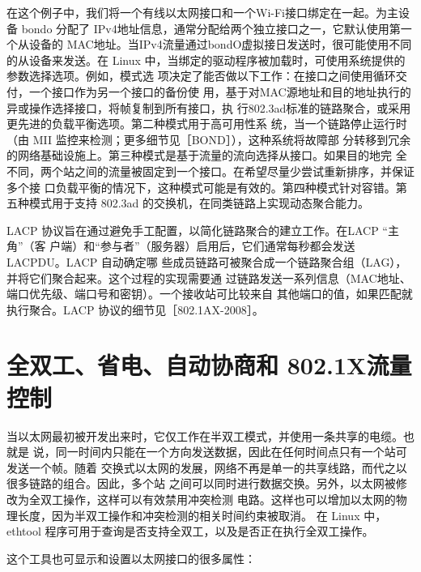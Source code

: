 在这个例子中，我们将一个有线以太网接口和一个Wi-Fi接口绑定在一起。为主设备
bondo 分配了 IPv4地址信息，通常分配给两个独立接口之一，它默认使用第一个从设备的
MAC地址。当IPv4流量通过bondO虚拟接日发送时，很可能使用不同的从设备来发送。在
Linux 中，当绑定的驱动程序被加载时，可使用系统提供的参数选择选项。例如，模式选
项决定了能否做以下工作：在接口之间使用循环交付，一个接口作为另一个接口的备份使
用，基于对MAC源地址和目的地址执行的异或操作选择接口，将帧复制到所有接口，执
行802.3ad标准的链路聚合，或采用更先进的负载平衡选项。第二种模式用于高可用性系
统，当一个链路停止运行时（由 MII 监控来检测；更多细节见［BOND］），这种系统将故障部
分转移到冗余的网络基础设施上。第三种模式是基于流量的流向选择从接口。如果目的地完
全不同，两个站之间的流量被固定到一个接口。在希望尽量少尝试重新排序，并保证多个接
口负载平衡的情况下，这种模式可能是有效的。第四种模式针对容错。第五种模式用于支持
802.3ad 的交换机，在同类链路上实现动态聚合能力。

LACP 协议旨在通过避免手工配置，以简化链路聚合的建立工作。在LACP “主角”（客
户端）和“参与者”（服务器）启用后，它们通常每秒都会发送LACPDU。LACP 自动确定哪
些成员链路可被聚合成一个链路聚合组（LAG），并将它们聚合起来。这个过程的实现需要通
过链路发送一系列信息（MAC地址、端口优先级、端口号和密钥）。一个接收站可比较来自
其他端口的值，如果匹配就执行聚合。LACP 协议的细节见［802.1AX-2008］。

\section{全双工、省电、自动协商和 802.1X流量控制}

当以太网最初被开发出来时，它仅工作在半双工模式，并使用一条共享的电缆。也就是
说，同一时间内只能在一个方向发送数据，因此在任何时间点只有一个站可发送一个帧。随着
交换式以太网的发展，网络不再是单一的共享线路，而代之以很多链路的组合。因此，多个站
之间可以同时进行数据交换。另外，以太网被修改为全双工操作，这样可以有效禁用冲突检测
电路。这样也可以增加以太网的物理长度，因为半双工操作和冲突检测的相关时间约束被取消。
在 Linux 中，ethtool 程序可用于查询是否支持全双工，以及是否正在执行全双工操作。

这个工具也可显示和设置以太网接口的很多属性：

